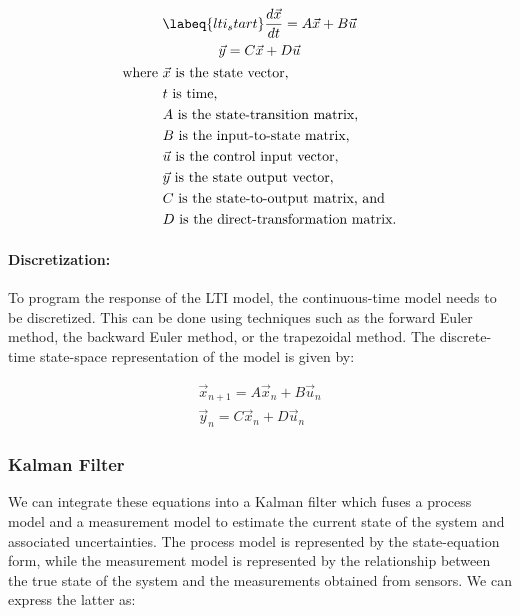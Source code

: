 \begin{gather} \labeq{lti_start}
    \frac{d\vec{x}}{dt} = A\vec{x} + B\vec{u} \\
    \vec{y} = C\vec{x} + D\vec{u} \\
    \begin{aligned}
        \text{where } & \vec{x} \text{ is the state vector,} \\
                      & t \text{ is time,} \\
                      & A \text{ is the state-transition matrix,} \\
                      & B \text{ is the input-to-state matrix,} \\
                      & \vec{u} \text{ is the control input vector,} \\
                      & \vec{y} \text{ is the state output vector,} \\
                      & C \text{ is the state-to-output matrix, and } \\
                      & D \text{ is the direct-transformation matrix}.
    \end{aligned} \notag
\end{gather}

\paragraph*{Discretization:} To program the response of the LTI model, the continuous-time model needs to be discretized. 
This can be done using techniques such as the forward Euler method, the backward Euler method, or the trapezoidal method. 
The discrete-time state-space representation of the model is given by:

\begin{gather}
    \vec{x}_{n+1} = A \vec{x}_n + B \vec{u}_n \\
    \vec{y}_n = C \vec{x}_n + D \vec{u}_n
\end{gather}
    
\subsubsection{Kalman Filter} 
We can integrate these equations into a Kalman filter which fuses a process model and a measurement model to estimate the current state of the system and associated uncertainties.
The process model is represented by the state-equation form, while the measurement model is represented by the relationship between the true state of the system and the measurements obtained from sensors.
We can express the latter as:


